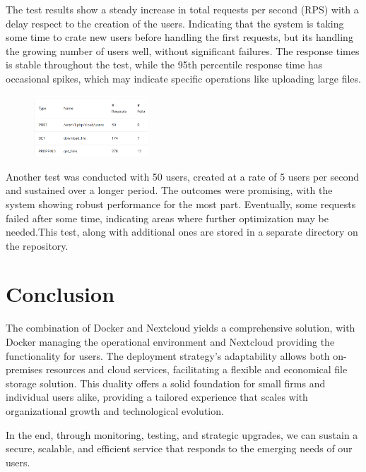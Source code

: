 \documentclass[12pt]{article}
\begin{document}
The test results show a steady increase in total requests per second (RPS) with a delay respect to the creation of the users. Indicating that the system is taking some time to crate new users before handling the first requests, but its handling the growing number of users well, without significant failures. The response times is stable throughout the test, while the 95th percentile response time has occasional spikes, which may indicate specific operations like uploading large files. 

\begin{figure}
  \centering
  \includegraphics[width=0.38\textwidth]{Test2_stat.png}
  
  \label{fig:yourlabel}
\end{figure}
Another test was conducted with 50 users, created at a rate of 5 users per second and  sustained over a longer period. The outcomes were promising, with the system showing robust performance for the most part. Eventually, some requests failed after some time, indicating areas where further optimization may be needed.This test, along with additional ones are stored in a separate directory on the repository. 




\section{Conclusion}
\label{sec:conclusion}
The combination of Docker and Nextcloud yields a comprehensive solution, with Docker managing the operational environment and Nextcloud providing the functionality for users. The deployment strategy's adaptability allows both on-premises resources and cloud services, facilitating a flexible and economical file storage solution. This duality offers a solid foundation for small firms and individual users alike, providing a tailored experience that scales with organizational growth and technological evolution.

In the end, through monitoring, testing, and strategic upgrades, we can sustain a secure, scalable, and efficient service that responds to the emerging needs of our users.
\end{document}
